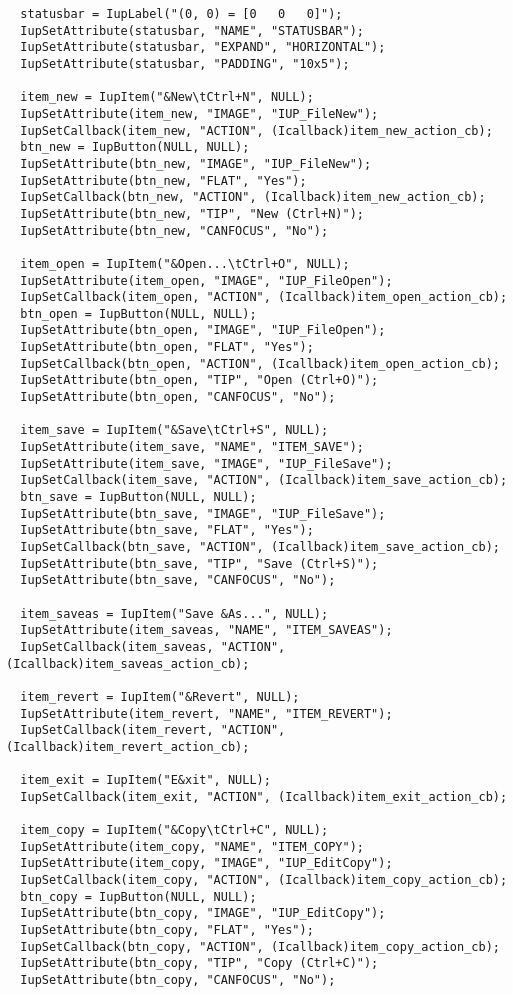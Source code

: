 \documentclass{ctexart}
\begin{document}
\begin{lstlisting}
  statusbar = IupLabel("(0, 0) = [0   0   0]");
  IupSetAttribute(statusbar, "NAME", "STATUSBAR");
  IupSetAttribute(statusbar, "EXPAND", "HORIZONTAL");
  IupSetAttribute(statusbar, "PADDING", "10x5");

  item_new = IupItem("&New\tCtrl+N", NULL);
  IupSetAttribute(item_new, "IMAGE", "IUP_FileNew");
  IupSetCallback(item_new, "ACTION", (Icallback)item_new_action_cb);
  btn_new = IupButton(NULL, NULL);
  IupSetAttribute(btn_new, "IMAGE", "IUP_FileNew");
  IupSetAttribute(btn_new, "FLAT", "Yes");
  IupSetCallback(btn_new, "ACTION", (Icallback)item_new_action_cb);
  IupSetAttribute(btn_new, "TIP", "New (Ctrl+N)");
  IupSetAttribute(btn_new, "CANFOCUS", "No");

  item_open = IupItem("&Open...\tCtrl+O", NULL);
  IupSetAttribute(item_open, "IMAGE", "IUP_FileOpen");
  IupSetCallback(item_open, "ACTION", (Icallback)item_open_action_cb);
  btn_open = IupButton(NULL, NULL);
  IupSetAttribute(btn_open, "IMAGE", "IUP_FileOpen");
  IupSetAttribute(btn_open, "FLAT", "Yes");
  IupSetCallback(btn_open, "ACTION", (Icallback)item_open_action_cb);
  IupSetAttribute(btn_open, "TIP", "Open (Ctrl+O)");
  IupSetAttribute(btn_open, "CANFOCUS", "No");

  item_save = IupItem("&Save\tCtrl+S", NULL);
  IupSetAttribute(item_save, "NAME", "ITEM_SAVE");
  IupSetAttribute(item_save, "IMAGE", "IUP_FileSave");
  IupSetCallback(item_save, "ACTION", (Icallback)item_save_action_cb);
  btn_save = IupButton(NULL, NULL);
  IupSetAttribute(btn_save, "IMAGE", "IUP_FileSave");
  IupSetAttribute(btn_save, "FLAT", "Yes");
  IupSetCallback(btn_save, "ACTION", (Icallback)item_save_action_cb);
  IupSetAttribute(btn_save, "TIP", "Save (Ctrl+S)");
  IupSetAttribute(btn_save, "CANFOCUS", "No");

  item_saveas = IupItem("Save &As...", NULL);
  IupSetAttribute(item_saveas, "NAME", "ITEM_SAVEAS");
  IupSetCallback(item_saveas, "ACTION", (Icallback)item_saveas_action_cb);

  item_revert = IupItem("&Revert", NULL);
  IupSetAttribute(item_revert, "NAME", "ITEM_REVERT");
  IupSetCallback(item_revert, "ACTION", (Icallback)item_revert_action_cb);

  item_exit = IupItem("E&xit", NULL);
  IupSetCallback(item_exit, "ACTION", (Icallback)item_exit_action_cb);

  item_copy = IupItem("&Copy\tCtrl+C", NULL);
  IupSetAttribute(item_copy, "NAME", "ITEM_COPY");
  IupSetAttribute(item_copy, "IMAGE", "IUP_EditCopy");
  IupSetCallback(item_copy, "ACTION", (Icallback)item_copy_action_cb);
  btn_copy = IupButton(NULL, NULL);
  IupSetAttribute(btn_copy, "IMAGE", "IUP_EditCopy");
  IupSetAttribute(btn_copy, "FLAT", "Yes");
  IupSetCallback(btn_copy, "ACTION", (Icallback)item_copy_action_cb);
  IupSetAttribute(btn_copy, "TIP", "Copy (Ctrl+C)");
  IupSetAttribute(btn_copy, "CANFOCUS", "No");


\end{lstlisting}
\end{document}
